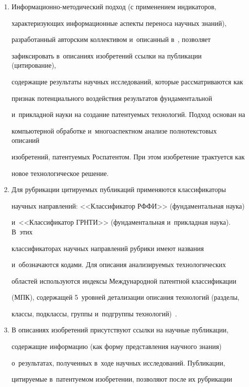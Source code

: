      \begin{enumerate}[1.]


\item Информационно-методический подход (с применением индикаторов, 


характеризующих информационные аспекты переноса научных знаний), 


разработанный авторским коллективом и~описанный в~\cite{2-mins}, позволяет 


зафиксировать в~описаниях изобретений ссылки на публикации (цитирование), 


содержащие результаты научных исследований, которые рассматриваются как 


признак потенциального воздействия результатов фундаментальной 


и~прикладной науки на создание патентуемых технологий. Подход основан на 


компьютерной обработке и~многоаспектном анализе полнотекстовых описаний 


изобретений, патентуемых Роспатентом. При этом изобретение трактуется как 


новое технологическое решение.


\item Для рубрикации цитируемых публикаций применяются классификаторы 


научных направлений: <<Классификатор РФФИ>> (фундаментальная наука) 


и~<<Классификатор ГРНТИ>> (фундаментальная и~прикладная наука). В~этих 


классификаторах научных направлений рубрики имеют названия 


и~обозначаются кодами. Для описания анализируемых технологических 


областей используются индексы Международной патентной классификации 


(МПК), содержащей 5~уровней детализации описания технологий (разделы, 


классы, подклассы, группы и~подгруппы технологий)~\cite{1-mins}.


\item В описаниях изобретений присутствуют ссылки на научные публикации, 


содержащие информацию (как форму представления научного знания) 


о~результатах, полученных в~ходе научных исследований. Публикации, 


цитируемые в~патентуемом изобретении, позволяют после их рубрикации 



\end{enumerate}
